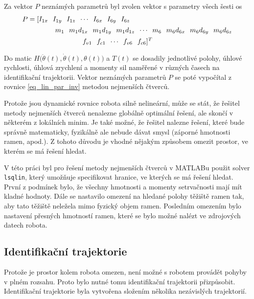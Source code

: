 Za vektor $P$ neznámých parametrů byl zvolen vektor s parametry všech šesti os
\[\addtolength{\arraycolsep}{-1.5pt}
\begin{split}
P &= 
[\begin{matrix} I_{1x} & I_{1y} & I_{1z} &\cdots &I_{6x} & I_{6y} & I_{6z} \end{matrix} \\
 &\qquad\qquad \begin{matrix}  m_1 & m_1d_{1x} & m_1d_{1y} & m_1d_{1z} &\cdots & m_6 & m_6d_{6x} & m_6d_{6y} & m_6d_{6z} \end{matrix} \\
 &\qquad\qquad\qquad\qquad \begin{matrix} f_{v1} & f_{c1} &\cdots & f_{v6} & f_{c6} \end{matrix}]^{T}
\end{split}
\]

Do matic $H\big(\ddot{\theta}(t),\dot{\theta}(t),\theta(t)\big)$ a $T(t)$ se dosadily jednotlivé polohy, úhlové rychlosti, úhlová zrychlení a momenty sil naměřené v různých časech na identifikační trajektorii. Vektor neznámých parametrů $P$ se poté vypočítal z rovnice \ref{eq_lin_par_inv} metodou nejmenších čtverců. 

Protože jsou dynamické rovnice robota silně nelineární, může se stát, že řešitel metody nejmenších čtverců nenalezne globálně optimální řešení, ale skončí v některém z lokálních minim. Je také možné, že řešitel nalezne řešení, které bude správně matematicky, fyzikálně ale nebude dávat smysl (záporné hmotnosti ramen, apod.). Z tohoto důvodu je vhodné nějakým způsobem omezit prostor, ve kterém se má řešení hledat.

V této práci byl pro řešení metody nejmenších čtverců v MATLABu použit solver \texttt{lsqlin}, který umožňuje specifikovat hranice, ve kterých se má řešení hledat. První z podmínek bylo, že všechny hmotnosti a momenty setrvačnosti mají mít kladné hodnoty. Dále se nastavilo omezení na hledané polohy těžiště ramen tak, aby tato těžiště neležela mimo fyzický objem ramen. Posledním omezením bylo nastavení přesných hmotností ramen, které se bylo možné nalézt ve zdrojových datech robota.

\label{postup_identifikace_ch}

\subsection{Identifikační trajektorie}

Protože je prostor kolem robota omezen, není možné s robotem provádět pohyby v plném rozsahu. Proto bylo nutné tomu identifikační trajektorii přizpůsobit. Identifikační trajektorie byla vytvořena složením několika nezávislých trajektorií. 

